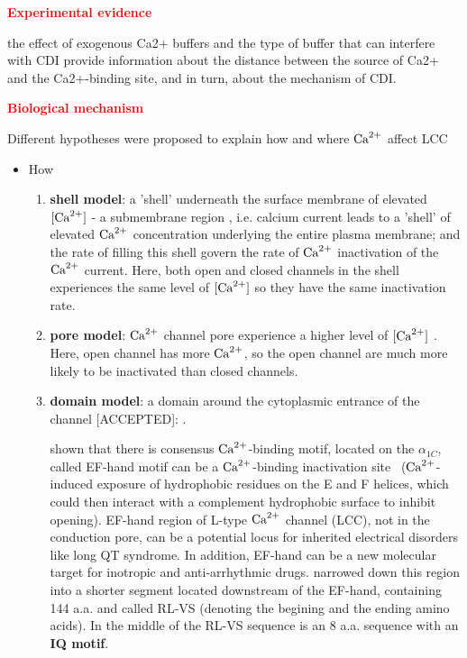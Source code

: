 \textcolor{red}{\bf Experimental evidence}

the effect of
exogenous Ca2+ buffers and the type of buffer that can
interfere with CDI provide information about the distance
between the source of Ca2+ and the Ca2+-binding
site, and in turn, about the mechanism of CDI.

\textcolor{red}{\bf Biological mechanism}

Different hypotheses were proposed to explain how and where ${\text{Ca}^{2+}}$ affect LCC
\begin{itemize}
  \item How
  \begin{enumerate}
    \item {\bf shell model}: a 'shell' underneath the surface membrane of
    elevated $[{\text{Ca}^{2+}}]$ - a submembrane region \citep{standen1982bsm,chad1984},
    i.e. calcium current leads to a 'shell' of elevated ${\text{Ca}^{2+}}$ concentration
    underlying the entire plasma membrane; and the rate of filling this 
    shell govern the rate of ${\text{Ca}^{2+}}$ inactivation of the
    ${\text{Ca}^{2+}}$ current. Here, both open and closed channels in the shell
    experiences the same level of $[{\text{Ca}^{2+}}]$ so they have the same inactivation
    rate.
    
    \item {\bf pore model}: ${\text{Ca}^{2+}}$ channel pore experience a
    higher level of $[{\text{Ca}^{2+}}]$ \citep{sherman1990, Keizer1992}.
    Here, open channel has more ${\text{Ca}^{2+}}$, so the open channel are much more likely
    to be inactivated than closed channels.
    
    \item {\bf domain model}: a domain around the cytoplasmic entrance of the
    channel [ACCEPTED]: \citep{chad1986, yue1990csi, imredy1992scd, imredy1994mcs,
    deleon1995ecb}.
    
    \citep{deleon1995ecb} shown that there is consensus ${\text{Ca}^{2+}}$-binding motif,
    located on the $\alpha_{1C}$, called EF-hand motif can be a ${\text{Ca}^{2+}}$-binding
    inactivation site~\citep{deleon1995ecb} (${\text{Ca}^{2+}}$-induced exposure of
    hydrophobic residues on the E and F helices, which could then interact with
    a complement hydrophobic surface to inhibit opening). EF-hand region of
    L-type ${\text{Ca}^{2+}}$ channel (LCC), not in the conduction pore, can be a potential
    locus for inherited electrical disorders like long QT syndrome. In addition,
    EF-hand can  be a new molecular target for inotropic and anti-arrhythmic
    drugs. \citep{qin1999} narrowed down this region into a shorter segment 
    located downstream of the EF-hand, containing 144 a.a. and called RL-VS
    (denoting the begining and the ending amino acids). In the middle of the
    RL-VS sequence is an 8 a.a. sequence with an {\bf IQ motif}.
    

\end{enumerate}
\end{itemize}
